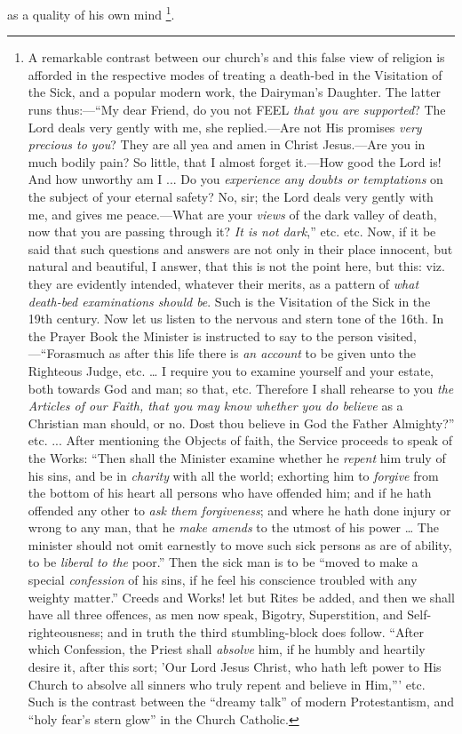 as a quality of his own mind \footnote{A remarkable
contrast between our church's and this false view of religion is
afforded in the respective modes of treating a death-bed in the
Visitation of the Sick, and a popular modern work, the Dairyman's
Daughter. The latter runs thus:—``My dear Friend, do you not
FEEL \emph{that you are supported}? The Lord deals very gently with
me, she replied.—Are not His promises \emph{very precious to you}?
They are all yea and amen in Christ Jesus.—Are you in much bodily
pain? So little, that I almost forget it.—How good the Lord is! And
how unworthy am I ... Do you \emph{experience any doubts or temptations}
on the subject of your eternal safety? No, sir; the Lord deals very
gently with me, and gives me peace.—What are your \emph{views} of
the dark valley of death, now that you are passing through it? \emph{It
is not dark},'' etc. etc. Now, if it be said that such
questions and answers are not only in their place innocent, but
natural and beautiful, I answer, that this is not the point here, but
this: viz. they are evidently intended, whatever their merits, as a
pattern of \emph{what death-bed examinations should be}. Such is the
Visitation of the Sick in the 19th century. Now let us listen to the
nervous and stern tone of the 16th. In the Prayer Book the Minister is
instructed to say to the person visited,—``Forasmuch as after
this life there is \emph{an account} to be given unto the Righteous
Judge, etc. … I require you to examine yourself and your estate,
both towards God and man; so that, etc. Therefore I shall rehearse to
you \emph{the Articles of our Faith, that you may know whether you do
believe} as a Christian man should, or no. Dost thou believe in God
the Father Almighty?'' etc. ... After mentioning the Objects of
faith, the Service proceeds to speak of the Works: ``Then shall
the Minister examine whether he \emph{repent} him truly of his sins,
and be in \emph{charity} with all the world; exhorting him to \emph{forgive}
from the bottom of his heart all persons who have offended him; and if
he hath offended any other to \emph{ask them forgiveness}; and where
he hath done injury or wrong to any man, that he \emph{make amends} to
the utmost of his power … The minister should not omit earnestly to
move such sick persons as are of ability, to be \emph{liberal to the}
poor.'' Then the sick man is to be ``moved to make a special \emph{confession}
of his sins, if he feel his conscience troubled with any weighty
matter.'' Creeds and Works! let but Rites be added, and then we
shall have all three offences, as men now speak, Bigotry,
Superstition, and Self-righteousness; and in truth the third
stumbling-block does follow. ``After which Confession, the Priest
shall \emph{absolve} him, if he humbly and heartily desire it, after
this sort; 'Our Lord Jesus Christ, who hath left power to His Church
to absolve all sinners who truly repent and believe in Him,'''
etc. Such is the contrast between the ``dreamy talk'' of
modern Protestantism, and ``holy fear's stern glow'' in the
Church Catholic.}.

